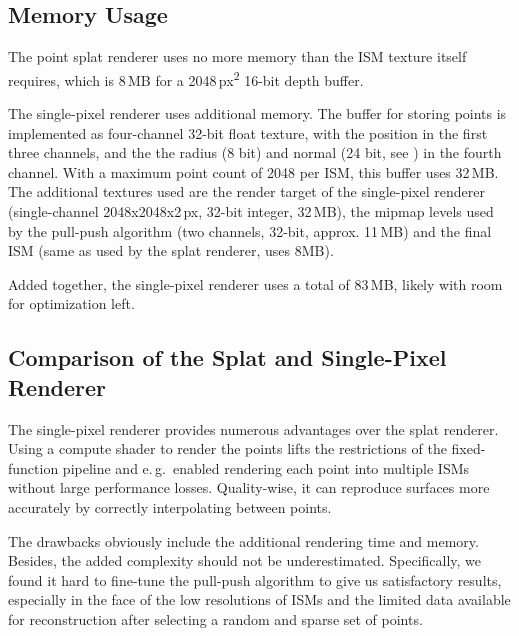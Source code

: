 

 \subsection{Memory Usage}

 The point splat renderer uses no more memory than the ISM texture itself requires, which is 8\,MB for a 2048\,px\textsuperscript{2} 16-bit depth buffer.

 The single-pixel renderer uses additional memory. The buffer for storing points is implemented as four-channel 32-bit float texture, with the position in the first three channels, and the the radius (8 bit) and normal (24 bit, see \cite{Cigolle:2014:NormalPacking}) in the fourth channel. With a maximum point count of 2048 per ISM, this buffer uses 32\,MB.
 The additional textures used are the render target of the single-pixel renderer (single-channel 2048x2048x2\,px, 32-bit integer, 32\,MB), the mipmap levels used by the pull-push algorithm (two channels, 32-bit, approx. 11\,MB) and the final ISM (same as used by the splat renderer, uses 8MB).

 Added together, the single-pixel renderer uses a total of 83\,MB, likely with room for optimization left.



 \subsection{Comparison of the Splat and Single-Pixel Renderer}

 The single-pixel renderer provides numerous advantages over the splat renderer. Using a compute shader to render the points lifts the restrictions of the fixed-function pipeline and e.\,g.\ enabled rendering each point into multiple ISMs without large performance losses. Quality-wise, it can reproduce surfaces more accurately by correctly interpolating between points.

 The drawbacks obviously include the additional rendering time and memory. Besides, the added complexity should not be underestimated. Specifically, we found it hard to fine-tune the pull-push algorithm to give us satisfactory results, especially in the face of the low resolutions of ISMs and the limited data available for reconstruction after selecting a random and sparse set of points.





